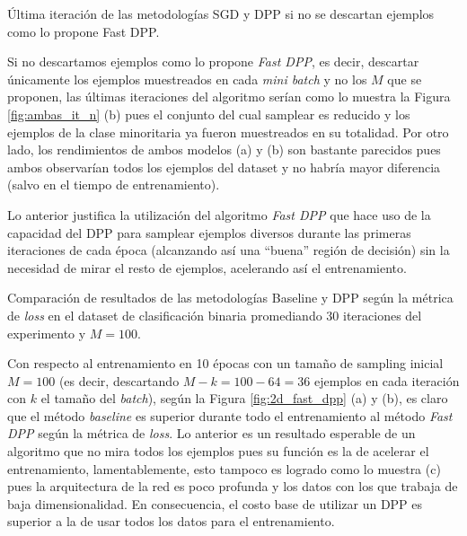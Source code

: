 \begin{images}[\label{fig:ambas_it_n}]{\centering Última iteración de las metodologías SGD y DPP si no se descartan ejemplos como lo propone Fast DPP.}

\end{images}

Si no descartamos ejemplos como lo propone \textit{Fast DPP}, es decir, descartar únicamente los ejemplos muestreados en cada \textit{mini batch} y no los $M$ que se proponen, las últimas iteraciones del algoritmo serían como lo muestra la Figura \ref{fig:ambas_it_n} (b) pues el conjunto del cual samplear es reducido y los ejemplos de la clase minoritaria ya fueron muestreados en su totalidad. Por otro lado, los rendimientos de ambos modelos (a) y (b) son bastante parecidos pues ambos observarían todos los ejemplos del dataset y no habría mayor diferencia (salvo en el tiempo de entrenamiento). 

\vspace{0.2cm}

Lo anterior justifica la utilización del algoritmo \textit{Fast DPP} que hace uso de la capacidad del DPP para samplear ejemplos diversos durante las primeras iteraciones de cada época (alcanzando así una ``buena'' región de decisión) sin la necesidad de mirar el resto de ejemplos, acelerando así el entrenamiento. 

\begin{images}[\label{fig:2d_fast_dpp}]{\centering Comparación de resultados de las metodologías Baseline y DPP según la métrica de \textit{loss} en el dataset de clasificación binaria promediando 30 iteraciones del experimento y $M=100$.}

\end{images}

Con respecto al entrenamiento en 10 épocas con un tamaño de sampling inicial $M = 100$ (es decir, descartando $M-k = 100-64 = 36$ ejemplos en cada iteración con $k$ el tamaño del \textit{batch}), según la Figura \ref{fig:2d_fast_dpp} (a) y (b), es claro que el método \textit{baseline} es superior durante todo el entrenamiento al método \textit{Fast DPP} según la métrica de \textit{loss}. Lo anterior es un resultado esperable de un algoritmo que no mira todos los ejemplos pues su función es la de acelerar el entrenamiento, lamentablemente, esto tampoco es logrado como lo muestra (c) pues la arquitectura de la red es poco profunda y los datos con los que trabaja de baja dimensionalidad. En consecuencia, el costo base de utilizar un DPP es superior a la de usar todos los datos para el entrenamiento.  

